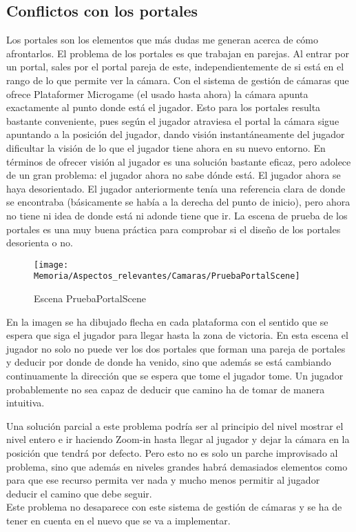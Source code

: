 \subsection{Conflictos con los portales}
Los portales son los elementos que más dudas me generan acerca de cómo afrontarlos. El problema de los portales es que trabajan en parejas. Al entrar por un portal, sales por el portal pareja de este, independientemente de si está en el rango de lo que permite ver la cámara. Con el sistema de gestión de cámaras que ofrece Plataformer Microgame (el usado hasta ahora) la cámara apunta exactamente al punto donde está el jugador. Esto para los portales resulta bastante conveniente, pues según el jugador atraviesa el portal la cámara sigue apuntando a la posición del jugador, dando visión instantáneamente del jugador dificultar la visión de lo que el jugador tiene ahora en su nuevo entorno. En términos de ofrecer visión al jugador es una solución bastante eficaz, pero adolece de un gran problema: el jugador ahora no sabe dónde está. El jugador ahora se haya desorientado. El jugador anteriormente tenía una referencia clara de donde se encontraba (básicamente se había a la derecha del punto de inicio), pero ahora no tiene ni idea de donde está ni adonde tiene que ir. La escena de prueba de los portales es una muy buena práctica para comprobar si el diseño de los portales desorienta o no.

\clearpage
\begin{figure}[h]
\texttt{[image: Memoria/Aspectos\_relevantes/Camaras/PruebaPortalScene]}
\caption{Escena PruebaPortalScene}
\end{figure}

En la imagen se ha dibujado flecha en cada plataforma con el sentido que se espera que siga el jugador para llegar hasta la zona de victoria. En esta escena el jugador no solo no puede ver los dos portales que forman una pareja de portales y deducir por donde de donde ha venido, sino que además se está cambiando continuamente la dirección que se espera que tome el jugador tome. Un jugador probablemente no sea capaz de deducir que camino ha de tomar de manera intuitiva.

Una solución parcial a este problema podría ser al principio del nivel mostrar el nivel entero e ir haciendo Zoom-in hasta llegar al jugador y dejar la cámara en la posición que tendrá por defecto. Pero esto no es solo un parche improvisado al problema, sino que además en niveles grandes habrá demasiados elementos como para que ese recurso permita ver nada y mucho menos permitir al jugador deducir el camino que debe seguir.\\
Este problema no desaparece con este sistema de gestión de cámaras y se ha de tener en cuenta en el nuevo que se va a implementar.

